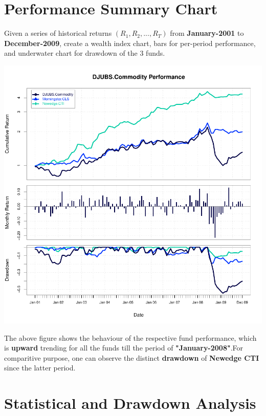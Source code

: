 \documentclass[12pt,letterpaper,english]{article}
\begin{document}

\section{Performance Summary Chart}

Given a series  of historical returns \((R_1,R_2, . . .,R_T)\) from \textbf{January-2001} to \textbf{December-2009}, create a wealth index chart, bars for per-period performance, and underwater chart for drawdown of the 3 funds.

\includegraphics{CommodityReport-002}

The above figure shows the behaviour of the respective fund performance, which is \textbf{upward} trending for all the funds till the period of \textbf{"January-2008"}.For comparitive purpose, one can observe the distinct \textbf{drawdown} of \textbf{Newedge CTI} since the latter period.

\section{Statistical and Drawdown Analysis}
\end{document}

